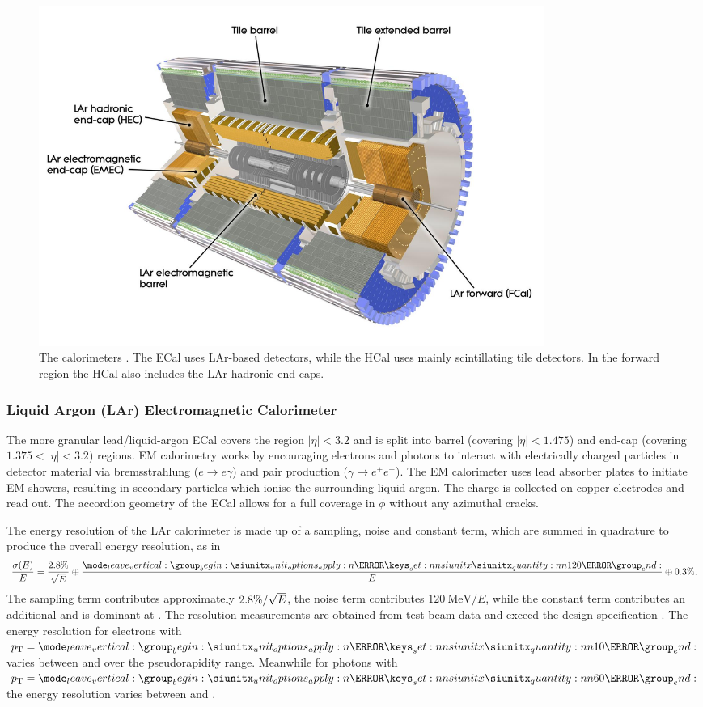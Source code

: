 %
\begin{figure}[!htpb]
  \centering
  \includegraphics[width=0.8\textwidth]{chapters/2.detector/figs/atlas_calos.jpg}
  \caption{
    The \ATLAS calorimeters \cite{atlascalo}.
    The ECal uses LAr-based detectors, while the HCal uses mainly scintillating tile detectors.
    In the forward region the HCal also includes the LAr hadronic end-caps.
  }
  \label{fig:atlas_calos}
\end{figure}
%


\subsubsection{Liquid Argon (LAr) Electromagnetic Calorimeter}
The more granular lead/liquid-argon ECal covers the region $|\eta|< 3.2$ and is split into barrel (covering $|\eta| < 1.475$) and end-cap (covering $1.375 < |\eta| < 3.2$) regions.
EM calorimetry works by encouraging electrons and photons to interact with electrically charged particles in detector material via bremsstrahlung ($e \rightarrow e\gamma$) and pair production ($\gamma \rightarrow e^+ e^- $).
The EM calorimeter uses lead absorber plates to initiate EM showers, resulting in secondary particles which ionise the surrounding liquid argon.
The charge is collected on copper electrodes and read out.
The accordion geometry of the ECal allows for a full coverage in $\phi$ without any azimuthal cracks.

The energy resolution of the LAr calorimeter is made up of a sampling, noise and constant term, which are summed in quadrature to produce the overall energy resolution, as in
%
\begin{equation}\label{eq:ecal_resolution}
  \frac{\sigma(E)}{E} = \frac{\pct{2.8}}{\sqrt{E}} \oplus \frac{\SI{120}{\MeV}}{E} \oplus \pct{0.3} .
\end{equation}
%
The sampling term contributes approximately $2.8\% / \sqrt{E}$, the noise term contributes $\SI{120}{\MeV} / {E}$, while the constant term contributes an additional  and is dominant at \highpt.
The resolution measurements are obtained from test beam data \cite{Cavallari:2011zza} and exceed the design specification \cite{ATLAS-TDR-14}.
The energy resolution for electrons with $\pt = \SI{10}{\GeV}$ varies between  and  over the pseudorapidity range.
Meanwhile for photons with $\pt = \SI{60}{\GeV}$ the energy resolution varies between  and  \cite{PERF-2017-03}.


